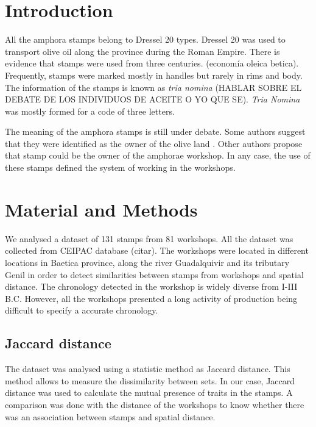 \documentclass[review]{elsarticle}
\begin{document}
\section{Introduction}


All the amphora stamps belong to Dressel 20 types. Dressel 20 was used to transport olive oil along the province during the Roman Empire. There is evidence that stamps were used from three centuries. (economía oleica betica). Frequently, stamps were marked mostly in handles but rarely in rims and body.  
The information of the stamps is known as \textit{tria nomina} (HABLAR SOBRE EL DEBATE DE LOS INDIVIDUOS DE ACEITE O YO QUE SE). \textit{Tria Nomina} was mostly formed for a code of three letters. 

The meaning of the amphora stamps is still under debate. Some authors suggest that they were identified as the owner of the olive land \citep{rodriguez_economioleicola_1977}. Other authors propose that stamp could be the owner of the amphorae workshop. In any case, the use of these stamps defined the system of working in the workshops. 

\section{Material and Methods}

We analysed a dataset of 131 stamps from 81 workshops. All the dataset was collected from CEIPAC database (citar). The workshops were located in different locations in Baetica province, along the river Guadalquivir and its tributary Genil in order to detect similarities between stamps from workshops and spatial distance. The chronology detected in the workshop is widely diverse from I-III B.C. However, all the workshops presented a long activity of production being difficult to specify a accurate chronology. 





\subsection{Jaccard distance}

The dataset was analysed using a statistic method as Jaccard distance. This method allows to measure the dissimilarity between sets. In our case, Jaccard distance was used to calculate the mutual presence of traits in the stamps. A comparison was done with the distance of the workshops to know whether there was an association between stamps and spatial distance. 
\end{document}
